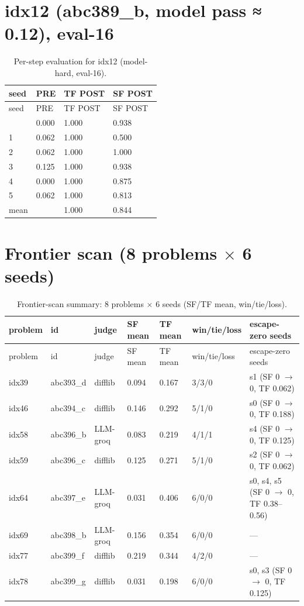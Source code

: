 \documentclass[12pt,a4paper]{report}
\begin{document}
\section{idx12 (abc389\_b, model pass ≈ 0.12), eval-16}\label{e.2-idx12-abc389_b-model-hard-model-pass-0.12-eval-16}

\begin{longtable}{llll}
\caption{Per-step evaluation for idx12 (model-hard, eval-16).}\\
\toprule
seed & PRE & TF POST & SF POST \\
\midrule
\endfirsthead
\toprule
seed & PRE & TF POST & SF POST \\
\midrule
\endhead
\bottomrule
\endfoot
0 & 0.000 & 1.000 & 0.938 \\
1 & 0.062 & 1.000 & 0.500 \\
2 & 0.062 & 1.000 & 1.000 \\
3 & 0.125 & 1.000 & 0.938 \\
4 & 0.000 & 1.000 & 0.875 \\
5 & 0.062 & 1.000 & 0.813 \\
mean & & 1.000 & 0.844 \\
\end{longtable}

\section{Frontier scan (8 problems $\times$ 6 seeds)}\label{e.3-frontier-scan-comprehensive-evaluations}

\begingroup\setlength{\tabcolsep}{3.5pt}
\begin{longtable}{llllll p{4.2cm}}
\caption{Frontier-scan summary: 8 problems $\times$ 6 seeds (SF/TF mean, win/tie/loss).}\\
\toprule
problem & id & judge & SF mean & TF mean & win/tie/loss & escape-zero seeds \\
\midrule
\endfirsthead
\toprule
problem & id & judge & SF mean & TF mean & win/tie/loss & escape-zero seeds \\
\midrule
\endhead
\bottomrule
\endfoot
idx39 & abc393\_d & difflib & 0.094 & 0.167 & 3/3/0 & s1 (SF 0 $\rightarrow$ 0, TF 0.062) \\
idx46 & abc394\_c & difflib & 0.146 & 0.292 & 5/1/0 & s0 (SF 0 $\rightarrow$ 0, TF 0.188) \\
idx58 & abc396\_b & LLM-groq & 0.083 & 0.219 & 4/1/1 & s4 (SF 0 $\rightarrow$ 0, TF 0.125) \\
idx59 & abc396\_c & difflib & 0.125 & 0.271 & 5/1/0 & s2 (SF 0 $\rightarrow$ 0, TF 0.062) \\
idx64 & abc397\_e & LLM-groq & 0.031 & 0.406 & 6/0/0 & s0, s4, s5 (SF 0 $\rightarrow$ 0, TF 0.38--0.56) \\
idx69 & abc398\_b & LLM-groq & 0.156 & 0.354 & 6/0/0 & --- \\
idx77 & abc399\_f & difflib & 0.219 & 0.344 & 4/2/0 & --- \\
idx78 & abc399\_g & difflib & 0.031 & 0.198 & 6/0/0 & s0, s3 (SF 0 $\rightarrow$ 0, TF 0.125) \\
\end{longtable}\endgroup
\end{document}

